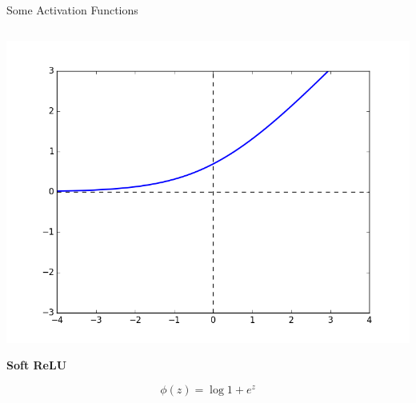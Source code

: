 \documentclass[handout,aspectratio=169]{beamer}
\begin{document}
\begin{frame}{Some Activation Functions}
\begin{columns}
    \begin{column}{0.25 \linewidth}
      \includegraphics[width=\linewidth]{pics/act_soft_relu.png}
      \begin{center}
        {\bf Soft ReLU}
      \end{center}
      \[ \phi(z) = \log 1 + e^z \]
    \end{column}
  \end{columns}
\end{frame}
\end{document}

